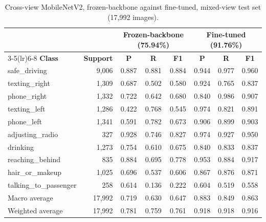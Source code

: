 \begin{table}[H]
\centering
\caption{Cross-view MobileNetV2, frozen-backbone against fine-tuned, mixed-view test set (17{,}992 images).}
\label{tab:app-crossview}
\footnotesize
\begin{tabular}{lrcccccc}
\toprule
& & \multicolumn{3}{c}{\textbf{Frozen-backbone} (75.94\%)} & \multicolumn{3}{c}{\textbf{Fine-tuned} (91.76\%)} \\
\cmidrule(lr){3-5}\cmidrule(lr){6-8}
\textbf{Class} & \textbf{Support} & \textbf{P} & \textbf{R} & \textbf{F1} & \textbf{P} & \textbf{R} & \textbf{F1} \\
\midrule
safe\_driving & 9{,}006 & 0.887 & 0.881 & 0.884 & 0.944 & 0.977 & 0.960 \\
texting\_right & 1{,}309 & 0.687 & 0.502 & 0.580 & 0.924 & 0.765 & 0.837 \\
phone\_right & 1{,}332 & 0.722 & 0.642 & 0.680 & 0.840 & 0.986 & 0.907 \\
texting\_left & 1{,}286 & 0.422 & 0.768 & 0.545 & 0.974 & 0.821 & 0.891 \\
phone\_left & 1{,}341 & 0.591 & 0.782 & 0.673 & 0.906 & 0.899 & 0.903 \\
adjusting\_radio & 327 & 0.928 & 0.746 & 0.827 & 0.974 & 0.927 & 0.950 \\
drinking & 1{,}273 & 0.754 & 0.610 & 0.675 & 0.840 & 0.833 & 0.837 \\
reaching\_behind & 835 & 0.884 & 0.695 & 0.778 & 0.953 & 0.884 & 0.917 \\
hair\_or\_makeup & 1{,}025 & 0.696 & 0.537 & 0.606 & 0.867 & 0.876 & 0.871 \\
talking\_to\_passenger & 258 & 0.614 & 0.136 & 0.222 & 0.604 & 0.519 & 0.558 \\
\midrule
Macro average & 17{,}992 & 0.719 & 0.630 & 0.647 & 0.883 & 0.849 & 0.863 \\
Weighted average & 17{,}992 & 0.781 & 0.759 & 0.761 & 0.918 & 0.918 & 0.916 \\
\bottomrule
\end{tabular}
\end{table}

